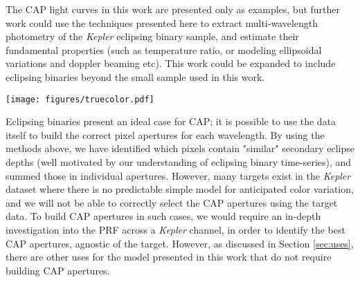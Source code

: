 \documentclass[iop]{emulateapj}
\newcommand{\kepler}{\emph{Kepler}\xspace}
\newcommand{\target}{KIC 2708156\xspace}
\begin{document}
The CAP light curves in this work are presented only as examples, but further work could use the  techniques presented here to extract multi-wavelength photometry of the \kepler eclipsing binary sample, and estimate their fundamental properties (such as temperature ratio, or modeling ellipsoidal variations and doppler beaming etc). This work could be expanded to include eclipsing binaries beyond the small sample used in this work.


\begin{figure*}
    \centering
    \texttt{[image: figures/truecolor.pdf]}
    \caption{The "true" colors for each pixel in the first four quarters of \target, estimated using our eclipsing binary model. White pixels are where no fit could be achieved, either due to low signal to noise, or saturation. Black pixels are (slightly) redder than the human eye can detect. This distribution is qualitatively similar to the PSF model shown in Figure 2, the "bluer" pixels are at the edges, and "redder" pixels are more concentrated towards the middle of the PRF.}
    \label{fig:true_color}
\end{figure*}

Eclipsing binaries present an ideal case for CAP; it is possible to use the data itself to build the correct pixel apertures for each wavelength. By using the methods above, we have identified which pixels contain "similar" secondary eclipse depths (well motivated by our understanding of eclipsing binary time-series), and summed those in individual apertures. However, many targets exist in the \kepler dataset where there is no predictable simple model for anticipated color variation, and we will not be able to correctly select the CAP apertures using the target data. To build CAP apertures in such cases, we would require an in-depth investigation into the PRF across a \kepler channel, in order to identify the best CAP apertures, agnostic of the target. However, as discussed in Section \ref{sec:uses}, there are other uses for the model presented in this work that do not require building CAP apertures.
\end{document}
